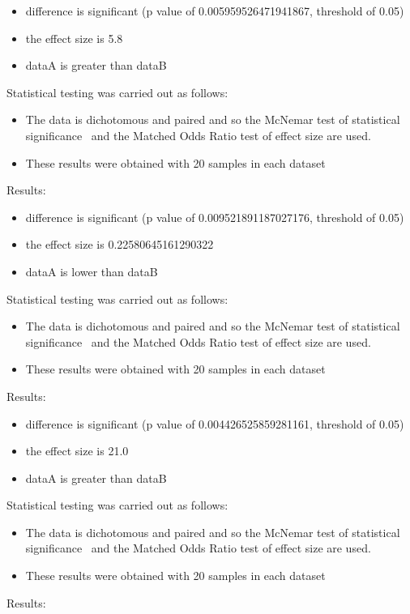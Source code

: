 \documentclass[]{article}
\begin{document}
\begin{itemize}
\item{difference is significant (p value of 0.005959526471941867, threshold of 0.05)}
\item{the effect size is 5.8}
\item{dataA is greater than dataB}
\end{itemize}Statistical testing was carried out as follows: \begin{itemize}
\item{The data is dichotomous and paired and so the McNemar test of statistical significance~\cite{Gibbons2011} and the Matched Odds Ratio test of effect size are used.}
\item{These results were obtained with 20 samples in each dataset}
\end{itemize}Results:
\begin{itemize}
\item{difference is significant (p value of 0.009521891187027176, threshold of 0.05)}
\item{the effect size is 0.22580645161290322}
\item{dataA is lower than dataB}
\end{itemize}Statistical testing was carried out as follows: \begin{itemize}
\item{The data is dichotomous and paired and so the McNemar test of statistical significance~\cite{Gibbons2011} and the Matched Odds Ratio test of effect size are used.}
\item{These results were obtained with 20 samples in each dataset}
\end{itemize}Results:
\begin{itemize}
\item{difference is significant (p value of 0.004426525859281161, threshold of 0.05)}
\item{the effect size is 21.0}
\item{dataA is greater than dataB}
\end{itemize}Statistical testing was carried out as follows: \begin{itemize}
\item{The data is dichotomous and paired and so the McNemar test of statistical significance~\cite{Gibbons2011} and the Matched Odds Ratio test of effect size are used.}
\item{These results were obtained with 20 samples in each dataset}
\end{itemize}Results:
\end{document}
